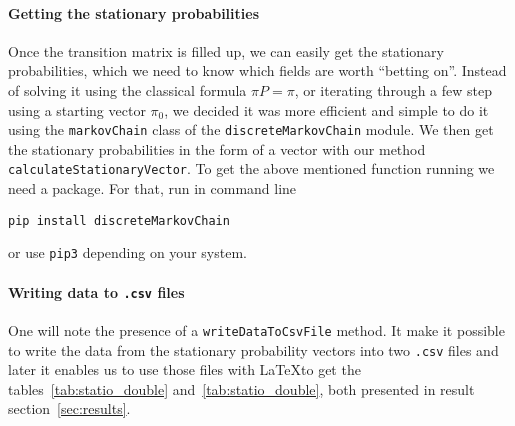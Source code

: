 \paragraph{Getting the stationary probabilities} %
\label{par:getting_the_stationary_probabilities}
Once the transition matrix is filled up, we can easily
get the stationary probabilities, which we need to know
which fields are worth \enquote{betting on}.
Instead of solving it using the classical formula $\pi P = \pi$,
or iterating through a few step using a starting vector $\pi_0$,
we decided it was more efficient and simple to do it using the 
\lstinline|markovChain| class of the \lstinline|discreteMarkovChain| module.
We then get the stationary probabilities in the form of a vector
with our method \lstinline|calculateStationaryVector|.
To get the above mentioned function running we need a package.
For that, run in command line
\begin{center}
  \lstinline|pip install discreteMarkovChain|
\end{center}
or use \lstinline|pip3| depending on your system.

\paragraph{Writing data to \texttt{.csv} files} %
\label{par:writing_data_to_csv_files}
One will note the presence of a \lstinline|writeDataToCsvFile|
method. It make it possible to write the data from the stationary probability
vectors into two \texttt{.csv} files and later it enables us to use those
files with \LaTeX to get the tables~\ref{tab:statio_double}
and~\ref{tab:statio_double}, both presented in result section~\ref{sec:results}.


